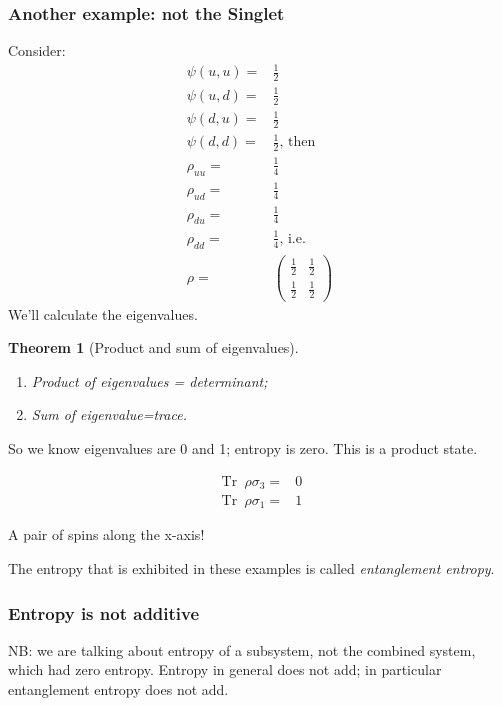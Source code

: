 \documentclass[]{article}
\newtheorem{thm}{Theorem}
\DeclareMathOperator{\Tr}{Tr \;}
\begin{document}
\subsubsection{Another example: not the Singlet}
Consider:
\begin{align*}
	\psi(u,u) =& \frac{1}{2}\\
	\psi(u,d) =& \frac{1}{2}\\
	\psi(d,u) =& \frac{1}{2}\\
	\psi(d,d) =& \frac{1}{2} \text{, then}\\
	\rho_{uu} =& \frac{1}{4} \\
	\rho_{ud} =& \frac{1}{4}\\
	\rho_{du} =&  \frac{1}{4}\\
	\rho_{dd} =&  \frac{1}{4} \text{, i.e.}\\
	\rho =& \begin{pmatrix}
		\frac{1} {2}&\frac{1} {2}\\
		\frac{1} {2} &\frac{1}{2}
	\end{pmatrix}	
\end{align*}
We'll calculate the eigenvalues.
\begin{thm}[Product and sum of eigenvalues]
	\begin{enumerate}
		\item Product of eigenvalues = determinant;
		\item Sum of eigenvalue=trace.
	\end{enumerate}
\end{thm}

So we know eigenvalues are 0 and 1; entropy is zero. This is a product state.

\begin{align*}
	\Tr \rho \sigma_3 =& 0\\
	\Tr \rho \sigma_1 =& 1
\end{align*}

A pair of spins along the x-axis!

The entropy that is exhibited in these examples is called \emph{entanglement entropy}. 



\subsubsection{Entropy is not additive}

NB: we are talking about entropy of a subsystem, not the combined system, which had zero entropy. Entropy in general does not add; in particular entanglement entropy does not add.
\end{document}

